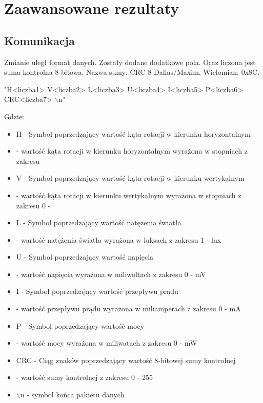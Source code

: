 \documentclass[10pt, a4paper]{article}
\begin{document}
\section{Zaawansowane rezultaty}
	\subsection{Komunikacja}
	Zmianie uległ format danych. Zostały dodane dodatkowe pola. Oraz liczona jest suma kontrolna 8-bitowa. Nazwa sumy: CRC-8-Dallas/Maxim, Wielomian: 0x8C.
		\begin{center}
			"H<liczba1> V<liczba2> L<liczba3> U<liczba4> I<liczba5> P<liczba6> CRC<liczba7> $\backslash$n"
		\end{center}
	Gdzie:
		\begin{itemize}
			\item H - Symbol poprzedzający wartość kąta rotacji w kierunku horyzontalnym
			\item <liczba1> - wartość kąta rotacji w kierunku horyzontalnym wyrażona w stopniach z zakresu \newline \unit[0 - 360]{\textdegree}
			\item V - Symbol poprzedzający wartość kąta rotacji w kierunku wertykalnym
			\item <liczba2> - wartość kąta rotacji w kierunku wertykalnym wyrażona w stopniach z zakresu 0 - \unit[180]{\textdegree}
			\item L - Symbol poprzedzający wartość natężenia światła
			\item <liczba3> - wartość natężenia światła wyrażona w luksach z zakresu 1 - \unit[65535]{lux}
			\item U - Symbol poprzedzający wartość napięcia
			\item <liczba4> - wartość napięcia wyrażona w miliwoltach z zakresu 0 - \unit[65535]{mV}
			\item I - Symbol poprzedzający wartość przepływu prądu
			\item <liczba5> - wartość przepływu prądu wyrażona w miliamperach z zakresu 0 - \unit[65535]{mA}
			\item P - Symbol poprzedzający wartość mocy
			\item <liczba6> - wartość mocy wyrażona w miliwatach z zakresu 0 - \unit[65535]{mW}
			\item CRC - Ciąg znaków poprzedzający wartość 8-bitowej sumy kontrolnej
			\item <liczba7> - wartość sumy kontrolnej z zakresu 0 - 255
			\item $\backslash$n - symbol końca pakietu danych
		\end{itemize}
\end{document}
